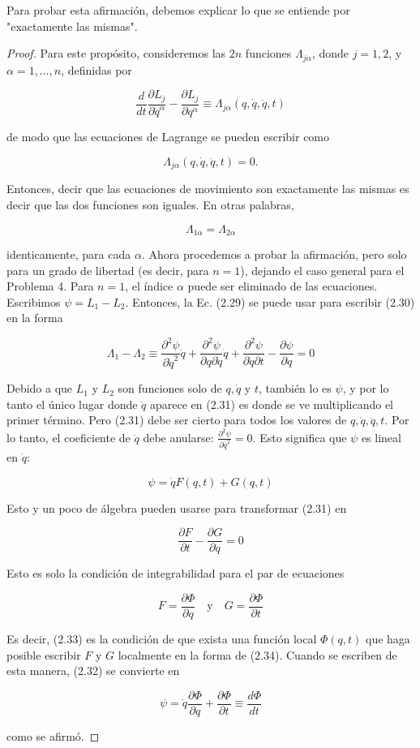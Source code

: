 Para probar esta afirmación, debemos explicar lo que se entiende por "exactamente las mismas". 
\begin{proof}
  Para este propósito, consideremos las $2 n$ funciones $\Lambda_{j \alpha}$, donde $j=1,2$, y $\alpha=1, \ldots, n$, definidas por

\[
\frac{d}{d t} \frac{\partial L_{j}}{\partial \dot{q}^{\alpha}}-\frac{\partial L_{j}}{\partial q^{\alpha}} \equiv \Lambda_{j \alpha}(q, \dot{q}, \ddot{q}, t)
\]

de modo que las ecuaciones de Lagrange se pueden escribir como 

\[
\Lambda_{j \alpha}(q, \dot{q}, \ddot{q}, t)=0.
\]

Entonces, decir que las ecuaciones de movimiento son exactamente las mismas es decir que las dos funciones son iguales. En otras palabras, 

\[
\Lambda_{1 \alpha}=\Lambda_{2 \alpha} \tag{2.30}
\]

identicamente, para cada $\alpha$. Ahora procedemos a probar la afirmación, pero solo para un grado de libertad (es decir, para $n=1$), dejando el caso general para el Problema 4. Para $n=1$, el índice $\alpha$ puede ser eliminado de las ecuaciones. Escribimos $\psi=L_{1}-L_{2}$. Entonces, la Ec. (2.29) se puede usar para escribir (2.30) en la forma 

\[
\Lambda_{1}-\Lambda_{2} \equiv \frac{\partial^{2} \psi}{\partial \dot{q}^{2}} \ddot{q}+\frac{\partial^{2} \psi}{\partial q \partial \dot{q}} \dot{q}+\frac{\partial^{2} \psi}{\partial \dot{q} \partial t}-\frac{\partial \psi}{\partial q}=0 \tag{2.31}
\]

Debido a que $L_{1}$ y $L_{2}$ son funciones solo de $q, \dot{q}$ y $t$, también lo es $\psi$, y por lo tanto el único lugar donde $\ddot{q}$ aparece en (2.31) es donde se ve multiplicando el primer término. Pero (2.31) debe ser cierto para todos los valores de $q, \dot{q}, \ddot{q}, t$. Por lo tanto, el coeficiente de $\ddot{q}$ debe anularse: $\frac{\partial^{2} \psi}{\partial \dot{q}^{2}}=0$. Esto significa que $\psi$ es lineal en $\dot{q}$:

\[
\psi=\dot{q} F(q, t)+G(q, t) \tag{2.32}
\]

Esto y un poco de álgebra pueden usarse para transformar (2.31) en 

\[
\frac{\partial F}{\partial t}-\frac{\partial G}{\partial q}=0 \tag{2.33}
\]

Esto es solo la condición de integrabilidad para el par de ecuaciones 

\[
F=\frac{\partial \Phi}{\partial q} \quad \text{y} \quad G=\frac{\partial \Phi}{\partial t} \tag{2.34}
\]

Es decir, (2.33) es la condición de que exista una función local $\Phi(q, t)$ que haga posible escribir $F$ y $G$ localmente en la forma de (2.34). Cuando se escriben de esta manera, (2.32) se convierte en 

\[
\psi=\dot{q} \frac{\partial \Phi}{\partial q}+\frac{\partial \Phi}{\partial t} \equiv \frac{d \Phi}{d t}
\]

como se afirmó.
\end{proof}

